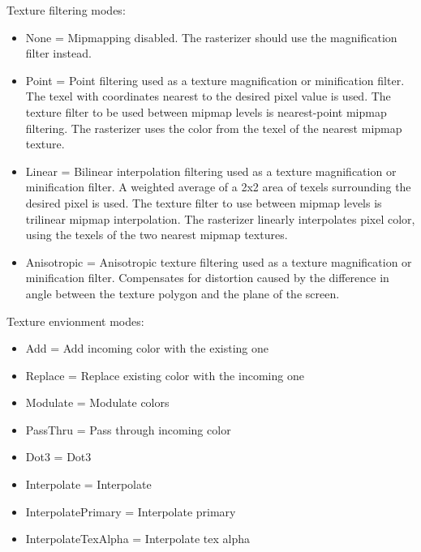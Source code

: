Texture filtering modes:\\
\begin{itemize}
\item{None        = Mipmapping disabled. The rasterizer should use the magnification filter instead.}
\item{Point       = Point filtering used as a texture magnification or minification filter. The texel
                    with coordinates nearest to the desired pixel value is used. The texture filter to
                    be used between mipmap levels is nearest-point mipmap filtering. The rasterizer uses
                    the color from the texel of the nearest mipmap texture.}
\item{Linear      = Bilinear interpolation filtering used as a texture magnification or minification filter.
                    A weighted average of a 2x2 area of texels surrounding the desired pixel is used. The
                    texture filter to use between mipmap levels is trilinear mipmap interpolation. The
                    rasterizer linearly interpolates pixel color, using the texels of the two nearest mipmap textures.}
\item{Anisotropic = Anisotropic texture filtering used as a texture magnification or minification filter.
                    Compensates for distortion caused by the difference in angle between the texture polygon
                    and the plane of the screen.}
\end{itemize}


Texture envionment modes:\\
\begin{itemize}
\item{Add                 = Add incoming color with the existing one}
\item{Replace             = Replace existing color with the incoming one}
\item{Modulate            = Modulate colors}
\item{PassThru            = Pass through incoming color}
\item{Dot3                = Dot3}
\item{Interpolate         = Interpolate}
\item{InterpolatePrimary  = Interpolate primary}
\item{InterpolateTexAlpha = Interpolate tex alpha}
\end{itemize}



